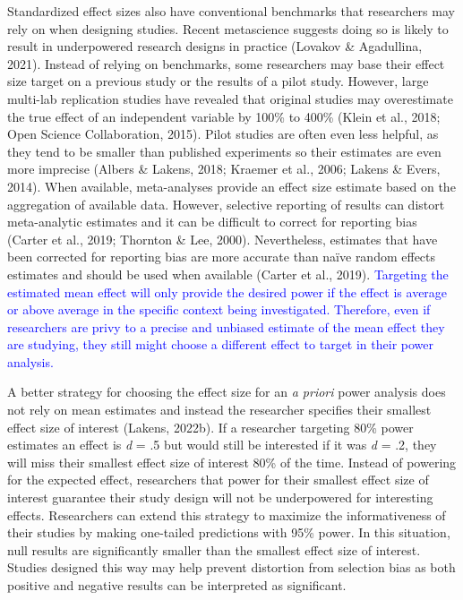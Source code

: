 \documentclass[
  man, donotrepeattitle,mask,floatsintext]{apa7}
\begin{document}
Standardized effect sizes also have conventional benchmarks that researchers may rely on when designing studies. Recent metascience suggests doing so is likely to result in underpowered research designs in practice (Lovakov \& Agadullina, 2021). Instead of relying on benchmarks, some researchers may base their effect size target on a previous study or the results of a pilot study. However, large multi-lab replication studies have revealed that original studies may overestimate the true effect of an independent variable by 100\% to 400\% (Klein et al., 2018; Open Science Collaboration, 2015). Pilot studies are often even less helpful, as they tend to be smaller than published experiments so their estimates are even more imprecise (Albers \& Lakens, 2018; Kraemer et al., 2006; Lakens \& Evers, 2014). When available, meta-analyses provide an effect size estimate based on the aggregation of available data. However, selective reporting of results can distort meta-analytic estimates and it can be difficult to correct for reporting bias (Carter et al., 2019; Thornton \& Lee, 2000). Nevertheless, estimates that have been corrected for reporting bias are more accurate than naïve random effects estimates and should be used when available (Carter et al., 2019). \textcolor{blue}{Targeting the estimated mean effect will only provide the desired power if the effect is average or above average in the specific context being investigated. Therefore, even if researchers are privy to a precise and unbiased estimate of the mean effect they are studying, they still might choose a different effect to target in their power analysis.}

A better strategy for choosing the effect size for an \emph{a priori} power analysis does not rely on mean estimates and instead the researcher specifies their smallest effect size of interest (Lakens, 2022b). If a researcher targeting 80\% power estimates an effect is \emph{d} = .5 but would still be interested if it was \emph{d} = .2, they will miss their smallest effect size of interest 80\% of the time. Instead of powering for the expected effect, researchers that power for their smallest effect size of interest guarantee their study design will not be underpowered for interesting effects. Researchers can extend this strategy to maximize the informativeness of their studies by making one-tailed predictions with 95\% power. In this situation, null results are significantly smaller than the smallest effect size of interest. Studies designed this way may help prevent distortion from selection bias as both positive and negative results can be interpreted as significant.
\end{document}
